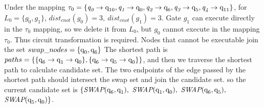 \documentclass[runningheads]{llncs}
\begin{document}
\begin{example}
	Under the mapping $\tau_{0}=\{\textit{q}_\textit{0}\rightarrow  \textup{q}_{\textup{10}},\textit{q}_\textit{1}\rightarrow \textup{q}_{\textup{0}},
\textit{q}_\textit{2}\rightarrow  \textup{q}_{\textup{6}},\textit{q}_\textit{3}\rightarrow  \textup{q}_{\textup{5}},\textit{q}_\textit{4}\rightarrow  \textup{q}_{\textup{11}}\}$, 
for $L_{0}=\{g_{0},g_{1}\}$, $dist_{cnot}(g_{0})=3,\ dist_{cnot}(g_{1})=3$. 
Gate $g_{1}$ can execute directly in the $\tau_{0}$ mapping, so we delete it from $L_{0}$,
but $g_{0}$ cannot execute in the mapping $\tau_{0}$.
Thus circuit transformation is required. 
Nodes that cannot be executable join the set $swap\_nodes=\{\textup{q}_{\textup{0}},\textup{q}_\textup{6}\}$
The shortest path is $paths=\{\{\textup{q}_{\textup{6}}\rightarrow \textup{q}_{\textup{1}} \rightarrow \textup{q}_{0} \},\{\textup{q}_\textup{6}\rightarrow \textup{q}_\textup{5} \rightarrow \textup{q}_\textup{0} \}\}$, 
and then we traverse the shortest path to calculate candidate set.
The two endpoints of the edge passed by the shortest path should intersect the swap set and join the candidate set.
so the current candidate set is $\{\textit{SWAP}(\textup{q}_\textup{6},\textup{q}_\textup{1}),$ $\textit{SWAP}(\textup{q}_\textup{1},\textup{q}_\textup{0}),$ $\textit{SWAP}(\textup{q}_\textup{6},\textup{q}_\textup{5}),$ $\textit{SWAP}(\textup{q}_\textup{5},\textup{q}_\textup{0}) \}$.
\end{example}
\end{document}
